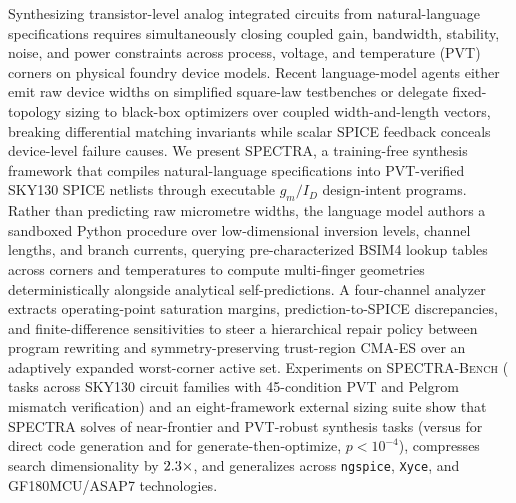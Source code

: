 Synthesizing transistor-level analog integrated circuits from natural-language specifications requires simultaneously closing coupled gain, bandwidth, stability, noise, and power constraints across process, voltage, and temperature (PVT) corners on physical foundry device models.
Recent language-model agents either emit raw device widths on simplified square-law testbenches or delegate fixed-topology sizing to black-box optimizers over coupled width-and-length vectors, breaking differential matching invariants while scalar SPICE feedback conceals device-level failure causes.
We present \textsc{SPECTRA}, a training-free synthesis framework that compiles natural-language specifications into PVT-verified SKY130 SPICE netlists through executable $g_m/I_D$ design-intent programs.
Rather than predicting raw micrometre widths, the language model authors a sandboxed Python procedure over low-dimensional inversion levels, channel lengths, and branch currents, querying pre-characterized BSIM4 lookup tables across corners and temperatures to compute multi-finger geometries deterministically alongside analytical self-predictions.
A four-channel analyzer extracts operating-point saturation margins, prediction-to-SPICE discrepancies, and finite-difference sensitivities to steer a hierarchical repair policy between program rewriting and symmetry-preserving trust-region CMA-ES over an adaptively expanded worst-corner active set.
Experiments on \textsc{SPECTRA-Bench} (\NTasksTotal{} tasks across \NPrimaryFamilies{} SKY130 circuit families with 45-condition PVT and Pelgrom mismatch verification) and an eight-framework external sizing suite show that \textsc{SPECTRA} solves \SpectraPrim{} of near-frontier and PVT-robust synthesis tasks (versus \DirectPrim{} for direct code generation and \GenboPrim{} for generate-then-optimize, $p < 10^{-4}$), compresses search dimensionality by $2.3{}\times$, and generalizes across \texttt{ngspice}, \texttt{Xyce}, and GF180MCU/ASAP7 technologies.
